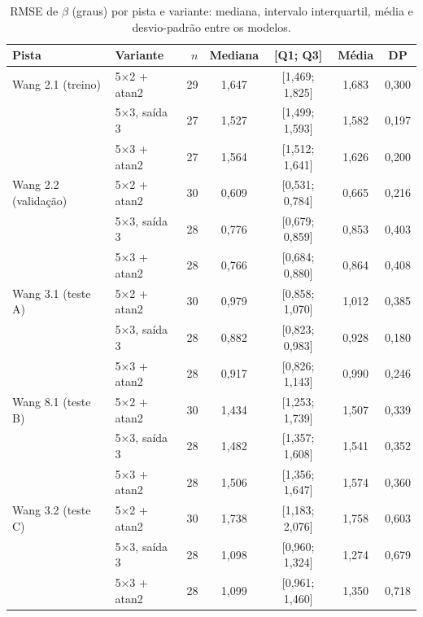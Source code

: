 \begin{table}[htbp]
    \centering
    \caption{RMSE de $\beta$ (graus) por pista e variante: mediana, intervalo interquartil, média e desvio-padrão entre os modelos.}
    \label{tab:resumo_beta}
    \footnotesize
    \begin{tabular}{llrcccc}
        \toprule
        \textbf{Pista} & \textbf{Variante} & $n$ & \textbf{Mediana} & \textbf{[Q1; Q3]} & \textbf{Média} & \textbf{DP} \\
        \midrule
        Wang 2.1 (treino) & 5×2 + atan2 & 29 & 1,647 & [1,469; 1,825] & 1,683 & 0,300 \\
         & 5×3, saída 3 & 27 & 1,527 & [1,499; 1,593] & 1,582 & 0,197 \\
         & 5×3 + atan2 & 27 & 1,564 & [1,512; 1,641] & 1,626 & 0,200 \\
        Wang 2.2 (validação) & 5×2 + atan2 & 30 & 0,609 & [0,531; 0,784] & 0,665 & 0,216 \\
         & 5×3, saída 3 & 28 & 0,776 & [0,679; 0,859] & 0,853 & 0,403 \\
         & 5×3 + atan2 & 28 & 0,766 & [0,684; 0,880] & 0,864 & 0,408 \\
        Wang 3.1 (teste A) & 5×2 + atan2 & 30 & 0,979 & [0,858; 1,070] & 1,012 & 0,385 \\
         & 5×3, saída 3 & 28 & 0,882 & [0,823; 0,983] & 0,928 & 0,180 \\
         & 5×3 + atan2 & 28 & 0,917 & [0,826; 1,143] & 0,990 & 0,246 \\
        Wang 8.1 (teste B) & 5×2 + atan2 & 30 & 1,434 & [1,253; 1,739] & 1,507 & 0,339 \\
         & 5×3, saída 3 & 28 & 1,482 & [1,357; 1,608] & 1,541 & 0,352 \\
         & 5×3 + atan2 & 28 & 1,506 & [1,356; 1,647] & 1,574 & 0,360 \\
        Wang 3.2 (teste C) & 5×2 + atan2 & 30 & 1,738 & [1,183; 2,076] & 1,758 & 0,603 \\
         & 5×3, saída 3 & 28 & 1,098 & [0,960; 1,324] & 1,274 & 0,679 \\
         & 5×3 + atan2 & 28 & 1,099 & [0,961; 1,460] & 1,350 & 0,718 \\
        \bottomrule
    \end{tabular}
\end{table}
